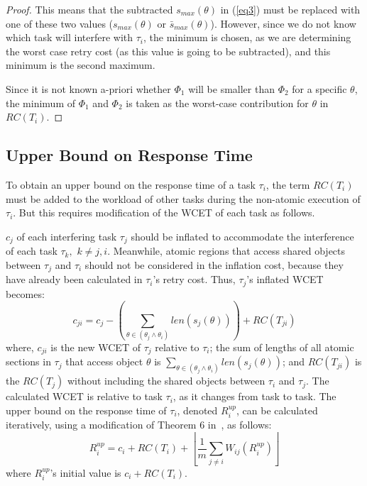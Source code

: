 \documentclass[12pt,english]{report}
\newtheorem{proof}{Proof}
\begin{document}
\begin{proof}
This means that the subtracted $s_{max}(\theta)$ in (\ref{eq3})
must be replaced with one of these two values ($s_{max}(\theta)$ or $\bar{s}_{max}(\theta)$). However, since we do not know  which task will interfere with $\tau_i$, the minimum is chosen, as we are determining the worst case retry cost (as this value is going to be subtracted),
and this minimum is the second maximum.

Since it is not known a-priori whether $\Phi_1$ will be smaller than $\Phi_2$ for a specific $\theta$, the minimum of $\Phi_1$ and $\Phi_2$ is taken as the worst-case contribution for $\theta$ in $RC(T_i)$. 
\end{proof}


\subsection{Upper Bound on Response Time}

To obtain an upper bound on the response time of a task $\tau_{i}$, the term $RC(T_{i})$ must be added to the workload of other tasks during the non-atomic
execution of $\tau_{i}$. But this requires modification of the WCET of each
task as follows. 

$c_{j}$ of each interfering task $\tau_{j}$ should be inflated to accommodate the interference of each task $\tau_{k},$ $k\ne j,i$. Meanwhile, atomic regions that access shared objects between $\tau_{j}$ and $\tau_{i}$ should not be considered in the inflation cost, because they have already been calculated in $\tau_{i}$'s retry cost. Thus, $\tau_{j}$'s inflated WCET becomes:
\begin{equation}
c_{ji}=c_{j}-\left(\sum_{\theta\in(\theta_{j}\wedge\theta_{i})}len \left(s_{j}(\theta) \right) \right)+RC(T_{ji})\label{eq9}\end{equation}
where, $c_{ji}$ is the new WCET of $\tau_{j}$ relative to $\tau_{i}$; 
the sum of lengths of all atomic sections in $\tau_{j}$ that access object $\theta$ is $\sum_{\theta \in (\theta_j \wedge \theta_i)} {len(s_{j}(\theta))}$; and $RC(T_{ji})$ is the $RC(T_j)$ 
 without including the shared objects between $\tau_{i}$ and $\tau_{j}$.
The calculated WCET is relative to task $\tau_{i}$, as it changes from task to task. The upper bound on the response time of $\tau_{i}$, denoted $R_{i}^{up}$, can be calculated iteratively, using a modification of Theorem 6 in~\cite{key-2}, as follows:
\begin{equation}
R_{i}^{up}=c_{i}+RC(T_{i})+\left\lfloor\frac{1}{m}\sum_{j\ne i}W_{ij}(R_{i}^{up})\right\rfloor
\label{eq10}
\end{equation}
where $R_{i}^{up}$'s initial value is $c_{i}+RC(T_{i})$.
\end{document}
